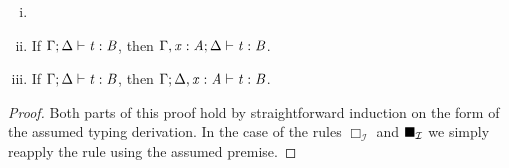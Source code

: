 \begin{lemma}[Weakening]
  \label{lemma:weakening}
  \begin{enumerate}[i.]
  \item[]
  \item If $\Gamma  ;  \Delta  \vdash  \mathit{t}  :  \mathit{B}$, then $\Gamma  ,  \mathit{x}  :  \mathit{A}  ;  \Delta  \vdash  \mathit{t}  :  \mathit{B}$.
  \item If $\Gamma  ;  \Delta  \vdash  \mathit{t}  :  \mathit{B}$, then $\Gamma  ;  \Delta  ,  \mathit{x}  :  \mathit{A}  \vdash  \mathit{t}  :  \mathit{B}$.
  \end{enumerate}
\end{lemma}
\begin{proof}
  Both parts of this proof hold by straightforward induction on the
  form of the assumed typing derivation.  In the case of the rules
  $\Box_{\mathcal{I}}$ and $\blacksquare_{\mathcal{I}}$ we simply reapply the
  rule using the assumed premise.
\end{proof}

